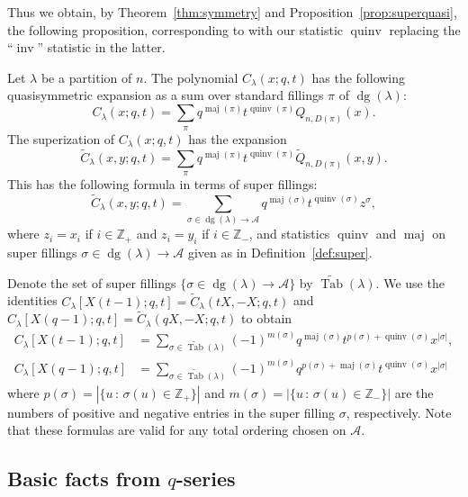 \documentclass[ALCO,Unicode]{cedram}
\DeclareMathOperator{\PQT}{Tab}
\DeclareMathOperator{\dg}{dg}
\DeclareMathOperator{\maj}{maj}
\DeclareMathOperator{\inv}{inv}
\DeclareMathOperator{\quinv}{quinv}
\begin{document}
Thus we obtain, by Theorem~\ref{thm:symmetry} and Proposition~\ref{prop:superquasi}, the following proposition, corresponding to \cite[Proposition 4.3]{HHL05} with our statistic $\quinv$ replacing the ``$\inv$'' statistic in the latter.

\begin{proposition}
Let $\lambda$ be a partition of $n$. The polynomial $C_{\lambda}(x;q,t)$ has the following quasisymmetric expansion as a sum over standard fillings $\pi$ of $\dg(\lambda)$:
\[
C_{\lambda}(x;q,t) = \sum_{\pi} q^{\maj(\pi)}t^{\quinv(\pi)}Q_{n,D(\pi)}(x).
\]
The superization of $C_{\lambda}(x;q,t)$ has the expansion
\[
\widetilde{C}_{\lambda}(x,y;q,t) = \sum_{\pi} q^{\maj(\pi)}t^{\quinv(\pi)}\widetilde{Q}_{n,D(\pi)}(x,y).
\]
This has the following formula in terms of super fillings:
\[
\widetilde{C}_{\lambda}(x,y;q,t) = \sum_{\sigma\in \dg(\lambda) \rightarrow \mathcal{A}} q^{\maj(\sigma)}t^{\quinv(\sigma)}z^{\sigma},
\] 
where $z_i = x_i$ if $i\in\mathbb{Z}_+$ and $z_i = y_i$ if $i\in\mathbb{Z}_-$, and statistics $\quinv$ and $\maj$ on super fillings $\sigma\in \dg(\lambda) \rightarrow \mathcal{A}$ given as in Definition~\ref{def:super}. 
\end{proposition}

Denote the set of super fillings $\{\sigma\in \dg(\lambda) \rightarrow \mathcal{A}\}$ by $\widetilde{\PQT}(\lambda)$. We use the identities $C_{\lambda}[X(t-1);q,t]=\widetilde{C}_{\lambda}(tX,-X;q,t)$ and $C_{\lambda}[X(q-1);q,t]=\widetilde{C}_{\lambda}(qX,-X;q,t)$ to obtain
\begin{align}
C_{\lambda}[X(t-1);q,t]& = \sum_{\sigma\in \widetilde{\PQT}(\lambda)} (-1)^{m(\sigma)} q^{\maj(\sigma)}t^{p(\sigma)+\quinv(\sigma)}x^{|\sigma|}, \label{C1}\\
C_{\lambda}[X(q-1);q,t]& = \sum_{\sigma\in \widetilde{\PQT}(\lambda)} (-1)^{m(\sigma)} q^{p(\sigma)+\maj(\sigma)}t^{\quinv(\sigma)}x^{|\sigma|} \label{C2}
\end{align}
where $p(\sigma) = |\{u\,:\,\sigma(u)\in\mathbb{Z}_+\}|$ and $m(\sigma) = |\{u\,:\,\sigma(u)\in\mathbb{Z}_-\}|$ are the numbers of positive and negative entries in the super filling $\sigma$, respectively. Note that these formulas are valid for any total ordering chosen on $\mathcal{A}$. 

\subsection{Basic facts from $q$-series}\label{sec:qseries}
\end{document}
